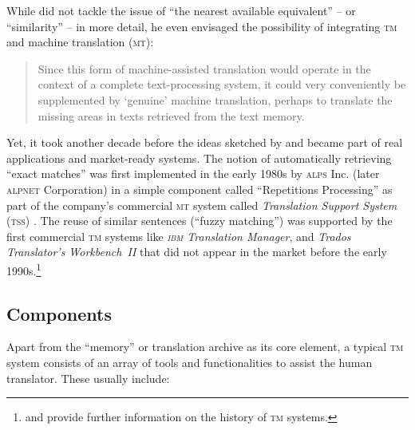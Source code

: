 \documentclass[output=paper]{LSP/langsci}
\begin{document}
While \citeauthor{Arthern1979} did not tackle the issue of ``the nearest available equivalent'' -- or ``similarity'' -- in more detail, he even envisaged the possibility of integrating \textsc{tm} and machine translation (\textsc{mt}):

\begin{quotation}
Since this form of machine-assisted translation would operate in the context of a com\-plete text-processing system, it could very conveniently be supple\-mented by `genuine' machine translation, perhaps to translate the missing areas in texts retrieved from the text memory. \citep[95]{Arthern1979}
\end{quotation}

Yet, it took another decade before the ideas sketched by \citeauthor{Krollmann1971} and \citeauthor{Arthern1979} became part of real applications and market-ready systems. The notion of automatically retrieving ``exact matches'' was first implemented in the early 1980s by \textsc{alps} Inc. (later \textsc{alpnet} Corporation) in a simple component called ``Repetitions Processing'' as part of the company's commercial \textsc{mt} system called \textit{Translation Support System}\textsc{ (\textsc{tss}) } \citep{Seal1992}. The reuse of similar sentences (``fuzzy matching'') was supported by the first commercial \textsc{tm} systems like \textit{\textsc{ibm} Translation Manager}, and \textit{Trados Translator's Workbench~II} that did not appear in the market before the early 1990s.\footnote{\citet{Hutchins1998} and \citet[36--41]{Reinke2004} provide further information on the history of \textsc{tm} systems.}

\subsection{Components}\label{sec:reinke:2.2}

Apart from the ``memory'' or translation archive as its core element, a typical \textsc{tm} system consists of an array of tools and functionalities to assist the human translator. These usually include:
\end{document}
